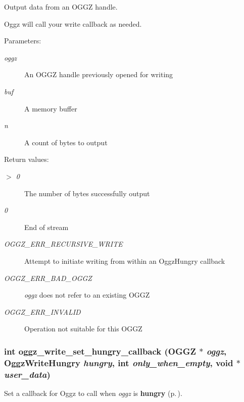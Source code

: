 Output data from an OGGZ handle. 

Oggz will call your write callback as needed.

\begin{Desc}
\item[Parameters:]
\begin{description}
\item[{\em oggz}]An OGGZ handle previously opened for writing \item[{\em buf}]A memory buffer \item[{\em n}]A count of bytes to output \end{description}
\end{Desc}
\begin{Desc}
\item[Return values:]
\begin{description}
\item[{\em $>$ 0}]The number of bytes successfully output \item[{\em 0}]End of stream \item[{\em OGGZ\_\-ERR\_\-RECURSIVE\_\-WRITE}]Attempt to initiate writing from within an Oggz\-Hungry callback \item[{\em OGGZ\_\-ERR\_\-BAD\_\-OGGZ}]{\em oggz\/} does not refer to an existing OGGZ \item[{\em OGGZ\_\-ERR\_\-INVALID}]Operation not suitable for this OGGZ \end{description}
\end{Desc}
\subsubsection{\setlength{\rightskip}{0pt plus 5cm}int oggz\_\-write\_\-set\_\-hungry\_\-callback ({\bf OGGZ} $\ast$ {\em oggz}, {\bf Oggz\-Write\-Hungry} {\em hungry}, int {\em only\_\-when\_\-empty}, void $\ast$ {\em user\_\-data})}\label{group__write__api_ga1}


Set a callback for Oggz to call when {\em oggz\/} is {\bf hungry }{\rm (p.\,\pageref{group__hungry})}. 

